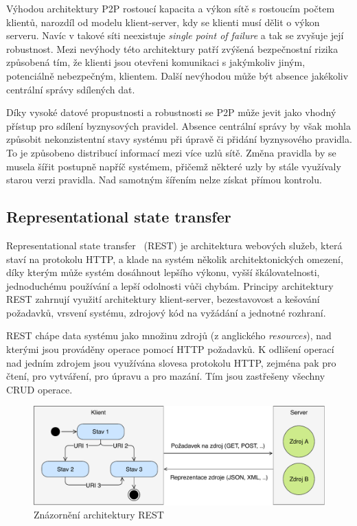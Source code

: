 Výhodou architektury \gls{P2P} rostoucí kapacita a výkon sítě s rostoucím počtem klientů,
narozdíl od modelu klient-server, kdy se klienti musí dělit o výkon serveru.
Navíc v takové síti neexistuje \textit{single point of failure} a tak se zvyšuje její robustnost.
Mezi nevýhody této architektury patří zvýšená bezpečnostní rizika způsobená tím,
že klienti jsou otevřeni komunikaci s jakýmkoliv jiným, potenciálně nebezpečným, klientem.
Další nevýhodou může být absence jakékoliv centrální správy sdílených dat.

Díky vysoké datové propustnosti a robustnosti se \gls{P2P} může jevit jako vhodný přístup pro
sdílení byznysových pravidel. Absence centrální správy by však mohla způsobit nekonzistentní stavy
systému při úpravě či přidání byznysového pravidla. To je způsobeno distribucí informací mezi více uzlů sítě.
Změna pravidla by se musela šířit postupně napříč systémem, přičemž některé uzly by stále využívaly starou
verzi pravidla. Nad samotným šířením nelze získat přímou kontrolu.

\subsection{Representational state transfer}\label{sec:rest}

Representational state transfer~\cite{fielding2000rest} (\gls{REST}) je architektura
webových služeb, která staví na protokolu \gls{HTTP}, a klade na systém
několik architektonických omezení, díky kterým může systém dosáhnout
lepšího výkonu, vyšší škálovatelnosti, jednoduchému používání
a lepší odolnosti vůči chybám. Principy architektury \gls{REST} zahrnují využití architektury klient-server,
bezestavovost a kešování požadavků, vrsvení systému, zdrojový kód na vyžádání a jednotné rozhraní.

\gls{REST} chápe data systému jako množinu zdrojů (z anglického \textit{resources}),
nad kterými jsou prováděny operace pomocí \gls{HTTP} požadavků. K odlišení operací
nad jedním zdrojem jsou využívána slovesa protokolu \gls{HTTP}, zejména pak  pro čtení,
 pro vytváření,  pro úpravu a  pro mazání. Tím jsou zastřešeny
všechny \gls{CRUD} operace.

\begin{figure}[t]
    \centering
    \includegraphics[keepaspectratio=true, width=0.9\linewidth]{figures/rest-statelessness.pdf}
    \caption{Znázornění architektury \gls{REST}}
    \label{fig:rest-statelessness}
\end{figure}

